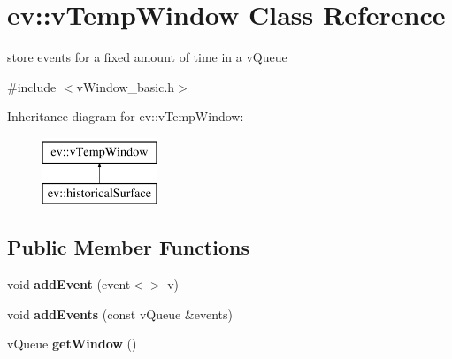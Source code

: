 \hypertarget{classev_1_1vTempWindow}{}\section{ev\+:\+:v\+Temp\+Window Class Reference}
\label{classev_1_1vTempWindow}


store events for a fixed amount of time in a v\+Queue  




{\ttfamily \#include $<$v\+Window\+\_\+basic.\+h$>$}

Inheritance diagram for ev\+:\+:v\+Temp\+Window\+:\begin{figure}[H]
\begin{center}
\leavevmode
\includegraphics[height=2.000000cm]{classev_1_1vTempWindow}
\end{center}
\end{figure}
\subsection*{Public Member Functions}
\begin{DoxyCompactItemize}
\item 
\mbox{\label{classev_1_1vTempWindow_a9499371e18cc811e2cd3e47e8e96f8ca}} 
void {\bfseries add\+Event} (event$<$$>$ v)
\item 
\mbox{\label{classev_1_1vTempWindow_a925ee62f3dff9517654fd6a9a402616b}} 
void {\bfseries add\+Events} (const v\+Queue \&events)
\item 
\mbox{\label{classev_1_1vTempWindow_a40ddfc12e259c028a57d5dd188b3e2e9}} 
v\+Queue {\bfseries get\+Window} ()
\end{DoxyCompactItemize}
